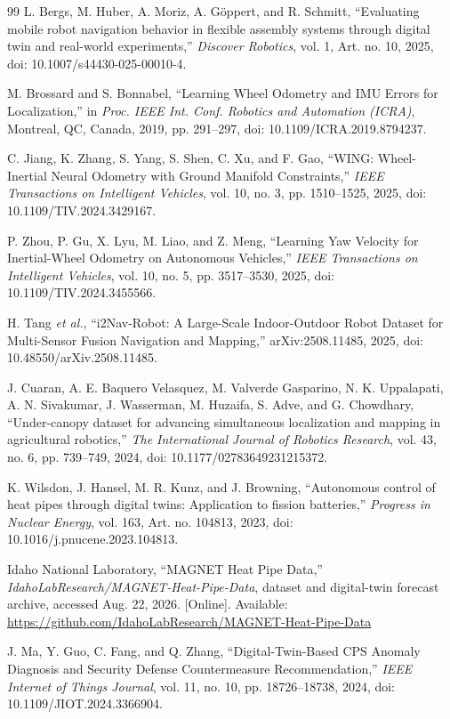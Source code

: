\documentclass[journal]{IEEEtran}
\begin{document}
\begin{thebibliography}{99}
L. Bergs, M. Huber, A. Moriz, A. G\"oppert, and R. Schmitt, ``Evaluating mobile robot navigation behavior in flexible assembly systems through digital twin and real-world experiments,'' \emph{Discover Robotics}, vol. 1, Art. no. 10, 2025, doi: 10.1007/s44430-025-00010-4.

M. Brossard and S. Bonnabel, ``Learning Wheel Odometry and IMU Errors for Localization,'' in \emph{Proc. IEEE Int. Conf. Robotics and Automation (ICRA)}, Montreal, QC, Canada, 2019, pp. 291--297, doi: 10.1109/ICRA.2019.8794237.

C. Jiang, K. Zhang, S. Yang, S. Shen, C. Xu, and F. Gao, ``WING: Wheel-Inertial Neural Odometry with Ground Manifold Constraints,'' \emph{IEEE Transactions on Intelligent Vehicles}, vol. 10, no. 3, pp. 1510--1525, 2025, doi: 10.1109/TIV.2024.3429167.

P. Zhou, P. Gu, X. Lyu, M. Liao, and Z. Meng, ``Learning Yaw Velocity for Inertial-Wheel Odometry on Autonomous Vehicles,'' \emph{IEEE Transactions on Intelligent Vehicles}, vol. 10, no. 5, pp. 3517--3530, 2025, doi: 10.1109/TIV.2024.3455566.

H. Tang \emph{et al.}, ``i2Nav-Robot: A Large-Scale Indoor-Outdoor Robot Dataset for Multi-Sensor Fusion Navigation and Mapping,'' arXiv:2508.11485, 2025, doi: 10.48550/arXiv.2508.11485.

J. Cuaran, A. E. Baquero Velasquez, M. Valverde Gasparino, N. K. Uppalapati, A. N. Sivakumar, J. Wasserman, M. Huzaifa, S. Adve, and G. Chowdhary, ``Under-canopy dataset for advancing simultaneous localization and mapping in agricultural robotics,'' \emph{The International Journal of Robotics Research}, vol. 43, no. 6, pp. 739--749, 2024, doi: 10.1177/02783649231215372.

K. Wilsdon, J. Hansel, M. R. Kunz, and J. Browning, ``Autonomous control of heat pipes through digital twins: Application to fission batteries,'' \emph{Progress in Nuclear Energy}, vol. 163, Art. no. 104813, 2023, doi: 10.1016/j.pnucene.2023.104813.

Idaho National Laboratory, ``MAGNET Heat Pipe Data,'' \emph{IdahoLabResearch/MAGNET-Heat-Pipe-Data}, dataset and digital-twin forecast archive, accessed Aug. 22, 2026. [Online]. Available: \url{https://github.com/IdahoLabResearch/MAGNET-Heat-Pipe-Data}

J. Ma, Y. Guo, C. Fang, and Q. Zhang, ``Digital-Twin-Based CPS Anomaly Diagnosis and Security Defense Countermeasure Recommendation,'' \emph{IEEE Internet of Things Journal}, vol. 11, no. 10, pp. 18726--18738, 2024, doi: 10.1109/JIOT.2024.3366904.


\end{thebibliography}
\end{document}
